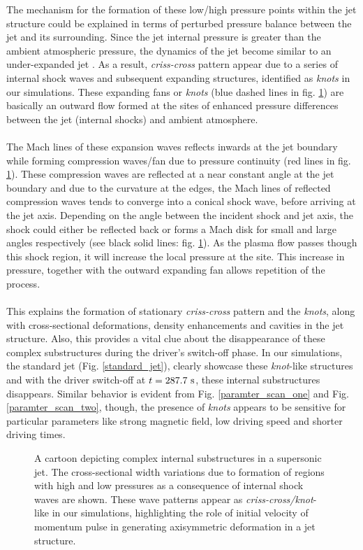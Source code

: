 \documentclass[12pt]{ociamthesis}
\newcommand{\fref}[1]{Fig. \eqref{#1}}
\newcommand{\np}{\\ \\}
\begin{document}
%
The mechanism for the formation of these low/high pressure points within the jet structure could be explained in terms of perturbed pressure balance between the jet and its surrounding. Since the jet internal pressure is greater than the ambient atmospheric pressure, the dynamics of the jet become similar to an under-expanded jet \citep{Norman1982, Edgington-Mitchell2014}. As a result, \textit{criss-cross} pattern appear due to a series of internal shock waves and subsequent expanding structures, identified as \textit{knots} in our simulations. These expanding fans or \textit{knots} (blue dashed lines in fig. \ref{cartoon_jet_waves}) are basically an outward flow formed at the sites of enhanced pressure differences between the jet (internal shocks) and ambient atmosphere. \np
%
The Mach lines of these expansion waves reflects inwards at the jet boundary while forming compression waves/fan due to pressure continuity (red lines in fig. \ref{cartoon_jet_waves}). These compression waves are reflected at a near constant angle at the jet boundary and due to the curvature at the edges, the Mach lines of reflected compression waves tends to converge into a conical shock wave, before arriving at the jet axis. Depending on the angle between the incident shock and jet axis, the shock could either be reflected back or forms a Mach disk for small and large angles respectively (see black solid lines: fig. \ref{cartoon_jet_waves}). As the plasma flow passes though this shock region, it will increase the local pressure at the site. This increase in pressure, together with the outward expanding fan allows repetition of the process. \np
%
This explains the formation of stationary \textit{criss-cross} pattern and the \textit{knots}, along with cross-sectional deformations, density enhancements and cavities in the jet structure. Also, this provides a vital clue about the disappearance of these complex substructures during the driver’s switch-off phase. In our simulations, the standard jet (\fref{standard_jet}), clearly showcase these \textit{knot}-like structures and with the driver switch-off at $t=287.7~\rm{s}$, these internal substructures disappears. Similar behavior is evident from \fref{paramter_scan_one} and \fref{paramter_scan_two}, though, the presence of \textit{knots} appears to be sensitive for particular parameters like strong magnetic field, low driving speed and shorter driving times.  
\begin{figure}
\captionsetup[subfigure]{labelformat=empty}
\centering
{}
\caption{A cartoon depicting complex internal substructures in a supersonic jet. The cross-sectional width variations due to formation of regions with high and low pressures as a consequence of internal shock waves are shown. These wave patterns appear as \textit{criss-cross/knot}-like in our simulations, highlighting the role of initial velocity of momentum pulse in generating axisymmetric deformation in a jet structure. }
\label{cartoon_jet_waves}
\end{figure}
\end{document}
